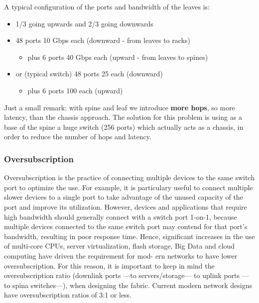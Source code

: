 A typical configuration of the ports and bandwidth of the leaves is:
\begin{itemize}
   \item 1/3 going upwards and 2/3 going downwards
   \item 48 ports 10 Gbps each (downward - from leaves to racks)
   \begin{itemize}
      \item plus 6 ports 40 Gbps each (upward - from leaves to spines)
   \end{itemize}
   \item or (typical switch) 48 ports 25 each (downward)
   \begin{itemize}
      \item plus 6 ports 100 each (upward)
   \end{itemize}
\end{itemize}

Just a small remark: with spine and leaf we introduce \textbf{more hops}, so more latency, than the chassis approach. The solution for this problem is using as
a base of the spine a huge switch (256 ports) which actually acts as a
chassis, in order to reduce the number of hops and latency.

\subsubsection{Oversubscription}
Oversubscription is the practice of connecting multiple devices to the same
switch port to optimize the use. For example, it is particulary useful to connect multiple slower devices to a single port to take advantage of the unused
capacity of the port and improve its utilization. However, devices and applications that require high bandwidth should generally connect with a switch
port 1-on-1, because multiple devices connected to the same switch port may
contend for that port’s bandwidth, resulting in poor response time. Hence,
significant increases in the use of multi-core CPUs, server virtualization, flash
storage, Big Data and cloud computing have driven the requirement for mod-
ern networks to have lower oversubscription. For this reason, it is important
to keep in mind the oversubscription ratio (downlink ports ---to servers/storage--- to uplink ports ---to spina switches---), when designing the fabric.
Current modern network designs have oversubscription ratios of 3:1 or less.


